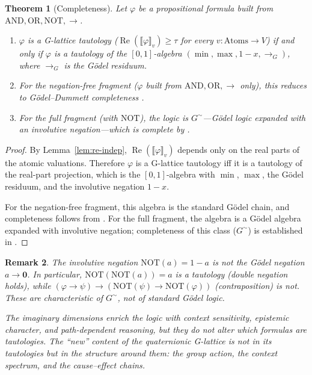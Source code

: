 \documentclass[11pt,a4paper]{article}
\newtheorem{theorem}{Theorem}
\newtheorem{remark}[theorem]{Remark}
\newcommand{\Real}{\operatorname{Re}}
\begin{document}
\begin{theorem}[Completeness]
\label{thm:completeness}
Let $\varphi$ be a propositional formula built from
$\mathrm{AND},\mathrm{OR},\mathrm{NOT},\to$.
\begin{enumerate}[nosep]
\item $\varphi$ is a G-lattice tautology
  ($\Real(\llbracket\varphi\rrbracket_v)\geq\tau$ for every
  $v:\mathrm{Atoms}\to V$)
  if and only if $\varphi$ is a tautology of the $[0,1]$-algebra
  $(\min,\max,1{-}x,\to_G)$, where $\to_G$ is the G\"odel
  residuum.
\item For the negation-free fragment
  ($\varphi$ built from $\mathrm{AND},\mathrm{OR},\to$ only),
  this reduces to G\"odel--Dummett completeness
  \citep{dummett1959,hajek1998}.
\item For the full fragment (with $\mathrm{NOT}$), the logic is
  $G^\sim$---G\"odel logic expanded with an involutive negation---which
  is complete by \citet{esteva2000}.
\end{enumerate}
\end{theorem}

\begin{proof}
By Lemma~\ref{lem:re-indep}, $\Real(\llbracket\varphi\rrbracket_v)$
depends only on the real parts of the atomic valuations. Therefore
$\varphi$ is a G-lattice tautology iff it is a tautology of the
real-part projection, which is the $[0,1]$-algebra with $\min$,
$\max$, the G\"odel residuum, and the involutive negation $1-x$.

For the negation-free fragment, this algebra is the standard G\"odel
chain, and completeness follows from \citet{dummett1959,hajek1998}.
For the full fragment, the algebra is a G\"odel algebra expanded with
involutive negation; completeness of this class ($G^\sim$) is
established in \citet{esteva2000}.
\end{proof}

\begin{remark}
The involutive negation $\mathrm{NOT}(a)=1-a$ is \emph{not} the
G\"odel negation $a\to\mathbf{0}$. In particular, $\mathrm{NOT}(\mathrm{NOT}(a))=a$ is a
tautology (double negation holds), while
$(\varphi\to\psi)\to(\mathrm{NOT}(\psi)\to\mathrm{NOT}(\varphi))$
(contraposition) is not. These are characteristic of $G^\sim$,
not of standard G\"odel logic.

The imaginary dimensions enrich the logic with context sensitivity,
epistemic character, and path-dependent reasoning, but they do not
alter which formulas are tautologies. The ``new'' content
of the quaternionic G-lattice is not in its tautologies but in the
\emph{structure around} them: the group action, the context spectrum,
and the cause--effect chains.
\end{remark}
\end{document}

